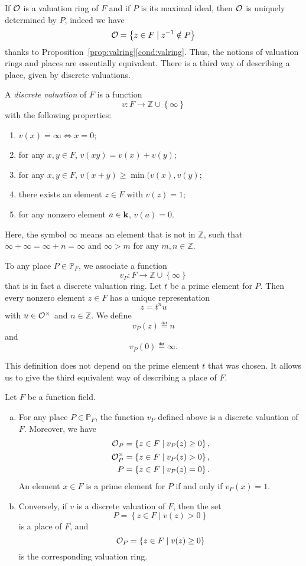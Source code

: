 If $\mathcal{O}$ is a valuation ring of $F$ and if $P$ is its maximal ideal, then $\mathcal{O}$
is uniquely determined by $P$, indeed we have
\[
  \mathcal{O} = \left\{ z\in F\mid z^{-1}\notin P \right\}
\]
thanks to Proposition~\ref{prop:valring}\ref{cond:valring}. Thus, the notions of
valuation rings and places are essentially equivalent. There is a third way of
describing a place, given by discrete valuations.
\begin{defi}
  A \emph{discrete valuation} of $F$ is a function
  \[
    v:F\to\mathbb{Z}\cup\left\{ \infty \right\}
  \]
  with the following properties:
  \begin{enumerate}
    \item $v(x) = \infty \Leftrightarrow x=0$;
    \item for any $x,y\in F$, $v(xy) = v(x)+v(y)$;
    \item for any $x,y\in F$, $v(x+y)\geq\min(v(x), v(y)$;
    \item there exists an element $z\in F$ with $v(z)=1$;
    \item for any nonzero element $a\in\mathbf{k}$, $v(a) = 0$.
  \end{enumerate}
\end{defi}
Here, the symbol $\infty$ means an element that is not in $\mathbb{Z}$, such
that $\infty+\infty = \infty + n = \infty$ and $\infty > m$ for any
$m,n\in\mathbb{Z}$.
\begin{defi}
  To any place $P\in\mathbb{P}_F$, we associate a function
  \[
    v_P:F\to\mathbb{Z}\cup\left\{ \infty \right\}
  \]
  that is in fact a discrete valuation ring. Let $t$ be a prime element for $P$.
  Then every nonzero element $z\in F$ has a unique representation
  \[
    z = t^n u
  \]
  with $u\in\mathcal{O}^\times$ and $n\in\mathbb{Z}$. We define
  \[
    v_P(z)\eqdef n
  \]
  and
  \[
    v_P(0)\eqdef\infty.
  \]
\end{defi}
This definition does not depend on the prime element $t$ that was chosen. It
allows us to give the third equivalent way of describing a place of $F$.
\begin{thm}
 Let $F$ be a function field.
 \begin{enumerate}[(a)]
   \item For any place $P\in\mathbb{P}_F$, the function $v_P$ defined above is a
     discrete valuation of $F$. Moreover, we have
     \begin{align*}
       \mathcal{O}_P &= \left\{ z\in F\mid v_P(z)\geq0 \right\},\\
       \mathcal{O}_P^\times &= \left\{ z\in F\mid v_P(z)>0 \right\},\\
       P &= \left\{ z\in F\mid v_P(z)=0 \right\}.
     \end{align*}
     An element $x\in F$ is a prime element for $P$ if and only if $v_P(x)=1$.
   \item Conversely, if $v$ is a discrete valuation of $F$, then the set
     \[
       P = \left\{ z\in F\mid v(z)>0 \right\}
     \]
     is a place of $F$, and
     \[
       \mathcal{O}_P = \left\{ z\in F\mid v(z)\geq0\right\}
     \]
     is the corresponding valuation ring.
 \end{enumerate}
\end{thm}

